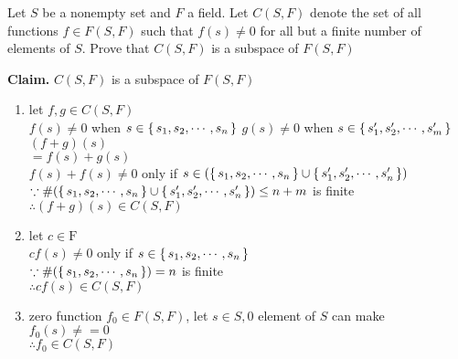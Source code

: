 Let $S$ be a nonempty set and $F$ a field. Let $C(S,F)$ denote the set of all functions $f \in F(S,F)$ such that $f(s) \neq 0$ for all but a finite number of elements of $S$. Prove that $C(S,F)$ is a subspace of $F(S,F)$

\begin{tcolorbox}
	\begin{solution}
		\textbf{Claim.} $C(S,F)$ is a subspace of $F(S,F)$
		
		\begin{enumerate}
			\item let $f,g \in C(S,F)$\\
			$f(s) \neq 0$ when $s \in \left\{ \,s_1,s_2,\cdots,s_n \,\right\}$
			$g(s) \neq 0$ when $s \in \left\{ \,s_1',s_2',\cdots,s_m' \,\right\}$
			$(f+g)(s)$\\
			$=f(s)+g(s)$\\
			$ f(s)+f(s) \neq 0 $ only if $s \in (\left\{ \,s_1,s_2,\cdots,s_n \,\right\}\cup\left\{ \,s'_1,s'_2,\cdots,s'_n \,\right\})$\\
			$\because \#(\left\{ \,s_1,s_2,\cdots,s_n \,\right\}\cup\left\{ \,s'_1,s'_2,\cdots,s'_n \,\right\}) \leq n+m$ is finite\\
			$\therefore (f+g)(s) \in C(S,F)$
			\item let $c \in \mathrm{F}$\\
			$cf(s) \neq 0$ only if $s \in \left\{ \,s_1,s_2,\cdots,s_n \,\right\}$\\
			$\because \#(\left\{ \,s_1,s_2,\cdots,s_n \,\right\}) = n$ is finite\\
			$\therefore cf(s) \in C(S,F)$
			\item zero function $f_0 \in F(S,F)$, let $s \in S, 0$ element of $S$ can make $f_0(s)\neq =0$\\
			$\therefore f_0 \in C(S,F)$
		\end{enumerate}
	\end{solution}	
\end{tcolorbox}